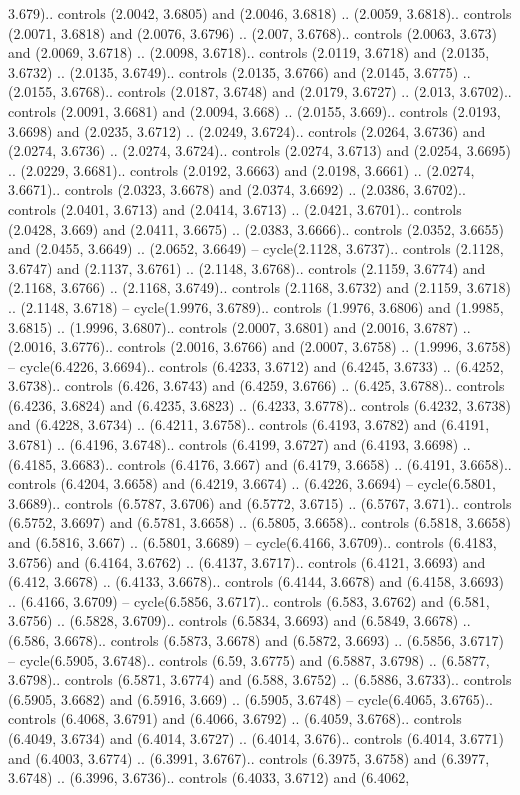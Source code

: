 3.679).. controls (2.0042, 3.6805) and (2.0046, 3.6818) .. (2.0059, 3.6818).. controls (2.0071, 3.6818) and (2.0076, 3.6796) .. (2.007, 3.6768).. controls (2.0063, 3.673) and (2.0069, 3.6718) .. (2.0098, 3.6718).. controls (2.0119, 3.6718) and (2.0135, 3.6732) .. (2.0135, 3.6749).. controls (2.0135, 3.6766) and (2.0145, 3.6775) .. (2.0155, 3.6768).. controls (2.0187, 3.6748) and (2.0179, 3.6727) .. (2.013, 3.6702).. controls (2.0091, 3.6681) and (2.0094, 3.668) .. (2.0155, 3.669).. controls (2.0193, 3.6698) and (2.0235, 3.6712) .. (2.0249, 3.6724).. controls (2.0264, 3.6736) and (2.0274, 3.6736) .. (2.0274, 3.6724).. controls (2.0274, 3.6713) and (2.0254, 3.6695) .. (2.0229, 3.6681).. controls (2.0192, 3.6663) and (2.0198, 3.6661) .. (2.0274, 3.6671).. controls (2.0323, 3.6678) and (2.0374, 3.6692) .. (2.0386, 3.6702).. controls (2.0401, 3.6713) and (2.0414, 3.6713) .. (2.0421, 3.6701).. controls (2.0428, 3.669) and (2.0411, 3.6675) .. (2.0383, 3.6666).. controls (2.0352, 3.6655) and (2.0455, 3.6649) .. (2.0652, 3.6649) -- cycle(2.1128, 3.6737).. controls (2.1128, 3.6747) and (2.1137, 3.6761) .. (2.1148, 3.6768).. controls (2.1159, 3.6774) and (2.1168, 3.6766) .. (2.1168, 3.6749).. controls (2.1168, 3.6732) and (2.1159, 3.6718) .. (2.1148, 3.6718) -- cycle(1.9976, 3.6789).. controls (1.9976, 3.6806) and (1.9985, 3.6815) .. (1.9996, 3.6807).. controls (2.0007, 3.6801) and (2.0016, 3.6787) .. (2.0016, 3.6776).. controls (2.0016, 3.6766) and (2.0007, 3.6758) .. (1.9996, 3.6758) -- cycle(6.4226, 3.6694).. controls (6.4233, 3.6712) and (6.4245, 3.6733) .. (6.4252, 3.6738).. controls (6.426, 3.6743) and (6.4259, 3.6766) .. (6.425, 3.6788).. controls (6.4236, 3.6824) and (6.4235, 3.6823) .. (6.4233, 3.6778).. controls (6.4232, 3.6738) and (6.4228, 3.6734) .. (6.4211, 3.6758).. controls (6.4193, 3.6782) and (6.4191, 3.6781) .. (6.4196, 3.6748).. controls (6.4199, 3.6727) and (6.4193, 3.6698) .. (6.4185, 3.6683).. controls (6.4176, 3.667) and (6.4179, 3.6658) .. (6.4191, 3.6658).. controls (6.4204, 3.6658) and (6.4219, 3.6674) .. (6.4226, 3.6694) -- cycle(6.5801, 3.6689).. controls (6.5787, 3.6706) and (6.5772, 3.6715) .. (6.5767, 3.671).. controls (6.5752, 3.6697) and (6.5781, 3.6658) .. (6.5805, 3.6658).. controls (6.5818, 3.6658) and (6.5816, 3.667) .. (6.5801, 3.6689) -- cycle(6.4166, 3.6709).. controls (6.4183, 3.6756) and (6.4164, 3.6762) .. (6.4137, 3.6717).. controls (6.4121, 3.6693) and (6.412, 3.6678) .. (6.4133, 3.6678).. controls (6.4144, 3.6678) and (6.4158, 3.6693) .. (6.4166, 3.6709) -- cycle(6.5856, 3.6717).. controls (6.583, 3.6762) and (6.581, 3.6756) .. (6.5828, 3.6709).. controls (6.5834, 3.6693) and (6.5849, 3.6678) .. (6.586, 3.6678).. controls (6.5873, 3.6678) and (6.5872, 3.6693) .. (6.5856, 3.6717) -- cycle(6.5905, 3.6748).. controls (6.59, 3.6775) and (6.5887, 3.6798) .. (6.5877, 3.6798).. controls (6.5871, 3.6774) and (6.588, 3.6752) .. (6.5886, 3.6733).. controls (6.5905, 3.6682) and (6.5916, 3.669) .. (6.5905, 3.6748) -- cycle(6.4065, 3.6765).. controls (6.4068, 3.6791) and (6.4066, 3.6792) .. (6.4059, 3.6768).. controls (6.4049, 3.6734) and (6.4014, 3.6727) .. (6.4014, 3.676).. controls (6.4014, 3.6771) and (6.4003, 3.6774) .. (6.3991, 3.6767).. controls (6.3975, 3.6758) and (6.3977, 3.6748) .. (6.3996, 3.6736).. controls (6.4033, 3.6712) and (6.4062, 